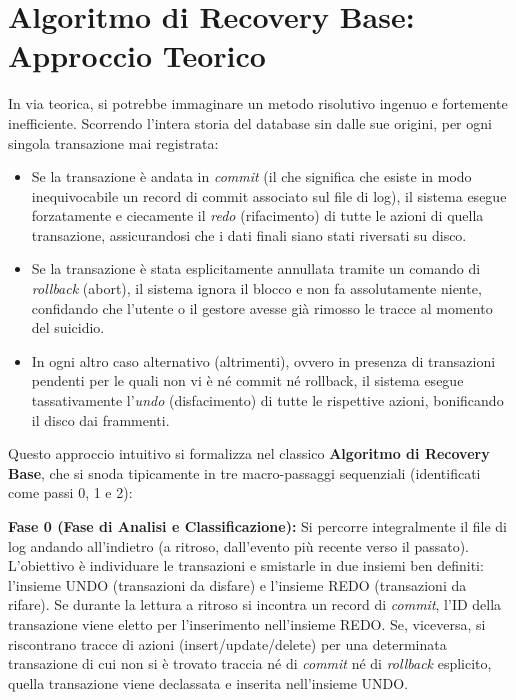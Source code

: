 \section{Algoritmo di Recovery Base: Approccio Teorico}

In via teorica, si potrebbe immaginare un metodo risolutivo ingenuo e fortemente inefficiente. Scorrendo l'intera storia del database sin dalle sue origini, per ogni singola transazione mai registrata:
\begin{itemize}
    \item Se la transazione è andata in \textit{commit} (il che significa che esiste in modo inequivocabile un record di commit associato sul file di log), il sistema esegue forzatamente e ciecamente il \textit{redo} (rifacimento) di tutte le azioni di quella transazione, assicurandosi che i dati finali siano stati riversati su disco.
    \item Se la transazione è stata esplicitamente annullata tramite un comando di \textit{rollback} (abort), il sistema ignora il blocco e non fa assolutamente niente, confidando che l'utente o il gestore avesse già rimosso le tracce al momento del suicidio.
    \item In ogni altro caso alternativo (altrimenti), ovvero in presenza di transazioni pendenti per le quali non vi è né commit né rollback, il sistema esegue tassativamente l'\textit{undo} (disfacimento) di tutte le rispettive azioni, bonificando il disco dai frammenti.
\end{itemize}

Questo approccio intuitivo si formalizza nel classico \textbf{Algoritmo di Recovery Base}, che si snoda tipicamente in tre macro-passaggi sequenziali (identificati come passi 0, 1 e 2):

\textbf{Fase 0 (Fase di Analisi e Classificazione):}
Si percorre integralmente il file di log andando all'indietro (a ritroso, dall'evento più recente verso il passato). L'obiettivo è individuare le transazioni e smistarle in due insiemi ben definiti: l'insieme UNDO (transazioni da disfare) e l'insieme REDO (transazioni da rifare). Se durante la lettura a ritroso si incontra un record di \textit{commit}, l'ID della transazione viene eletto per l'inserimento nell'insieme REDO. Se, viceversa, si riscontrano tracce di azioni (insert/update/delete) per una determinata transazione di cui non si è trovato traccia né di \textit{commit} né di \textit{rollback} esplicito, quella transazione viene declassata e inserita nell'insieme UNDO.

